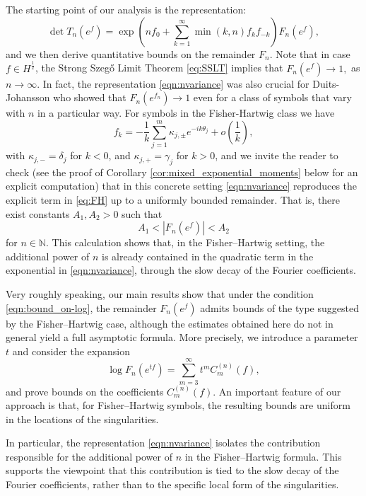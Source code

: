 \documentclass[11pt]{amsart}
\theoremstyle{plain}
\theoremstyle{remark}
\numberwithin{equation}{section}
\begin{document}
The starting point of our analysis is the representation:
\begin{equation}\label{eqn:nvariance}
\det T_n(e^f)
=
\exp\left(
n f_0+\sum_{k=1}^{\infty}\min(k,n)f_kf_{-k}
\right)
F_n(e^f),
\end{equation}
and we then derive quantitative bounds on the remainder $F_n$. Note that in case $f\in H^{\frac12}$, the Strong Szeg\H{o} Limit Theorem
\eqref{eq:SSLT} implies that
$
F_n(e^f)\to 1,$ as 
$ n\to\infty.$ In fact, the representation \eqref{eqn:nvariance} was also crucial for   Duits-Johansson \cite{DuiJoh} who showed that $F_n(e^{f_n})\rightarrow 1$ even for a class of symbols that vary with $n$ in a particular way.
For symbols in the Fisher-Hartwig class we have 
\begin{equation}\label{eqn:fourier_dec}
f_k= -\frac{1}{k}\sum_{j=1}^m \kappa_{j,\pm} e^{-ik\theta_j}+o\left(\frac{1}{k}\right),
\end{equation}
with $\kappa_{j,-}=\delta_j$ for $k<0$, and $\kappa_{j,+}=\gamma_j$ for $k>0$,
and we invite the reader to check (see the proof of Corollary \ref{cor:mixed_exponential_moments} below for an explicit computation) that in this concrete setting 
\eqref{eqn:nvariance} reproduces the explicit term in \eqref{eq:FH} up to a uniformly bounded remainder.  That is, there exist constants $A_1,A_2>0$ such that
$$A_1<|F_n(e^f)|<A_2$$
for $n \in \mathbb N.$  
This calculation shows that, in the Fisher--Hartwig setting, the additional power of $n$ is already contained in the quadratic term in the exponential in \eqref{eqn:nvariance}, through the slow decay of the Fourier coefficients.


Very roughly speaking, our main results show that under the condition \eqref{eqn:bound_on-log}, the remainder $F_n(e^f)$ admits bounds of the type suggested by the Fisher--Hartwig case, although the estimates obtained here do not in general yield a full asymptotic formula. More precisely, we introduce a parameter $t$ and consider the expansion 
$$
\log F_n(e^{tf})= \sum_{m=3}^\infty t^m C_m^{(n)}(f),
$$
and prove bounds on the coefficients $C_m^{(n)}(f)$.
An important feature of our approach is that, for Fisher--Hartwig symbols, the resulting bounds are uniform in the locations of the singularities.

In particular, the representation \eqref{eqn:nvariance} isolates the contribution responsible for the additional power of $n$ in the Fisher--Hartwig formula. This supports the viewpoint that this contribution is tied to the slow decay of the Fourier coefficients, rather than to the specific local form of the singularities.
\end{document}
